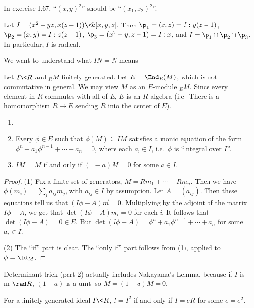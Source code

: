  In exercise I.67, ``$(x,y)^2$'' should be ``$(x_1,x_2)^2$''.

 \begin{example}
   Let $I=(x^2-yz, x(z-1))\< k[x,y,z]$. Then $\p_1=(x,z)=I:y(z-1)$, $\p_2=(x,y)=I:z(z-1)$,
   $\p_3=(x^2-y,z-1)=I:x$, and $I=\p_1\cap\p_2\cap\p_3$. In particular, $I$ is radical.
 \end{example}

 We want to understand what $IN=N$ means.

 Let $I\< R$ and ${}_R M$ finitely generated. Let
 $E=\End_R (M)$, which is not commutative in general. We may view $M$ as an $E$-module
 ${}_E M$. Since every element in $R$ commutes with all of $E$, $E$ is an $R$-algebra (i.e.\
 There is a homomorphism $R\to E$ sending $R$ into the center of $E$).
 \begin{lemma}
  \begin{enumerate}\item[]
    \item Every $\phi\in E$ such that $\phi(M)\subseteq IM$ satisfies a monic equation
    of the form $\phi^n+a_1\phi^{n-1} +\cdots + a_n=0$, where each $a_i\in I$, i.e.\
    $\phi$ is ``integral over $I$''.

    \item $IM=M$ if and only if $(1-a)M=0$ for some $a\in I$.
  \end{enumerate}
 \end{lemma}
 \begin{proof}
   (1) Fix a finite set of generators, $M=Rm_1+\cdots + Rm_n$. Then we have
   $\phi(m_i)=\sum_j a_{ij} m_j$, with $a_{ij}\in I$ by assumption. Let $A=(a_{ij})$.
   Then these equations tell us that $(I\phi-A)\vec{m}=0$. Multiplying by the adjoint of
   the matrix $I\phi-A$, we get that $\det(I\phi-A)m_i=0$ for each $i$. It follows that
   $\det(I\phi-A)=0\in E$. But $\det(I\phi-A)=\phi^n+a_1\phi^{n-1}+\cdots +a_n$ for some
   $a_i\in I$.

   (2) The ``if'' part is clear. The ``only if'' part follows from (1), applied to
   $\phi=\id_M$.
 \end{proof}
 \begin{remark}
   Determinant trick (part 2) actually includes Nakayama's Lemma, because if $I$ is in
   $\rad R$, $(1-a)$ is a unit, so $M=(1-a)M=0$.
 \end{remark}
 \begin{corollary}
   For a finitely generated ideal $I\< R$, $I=I^2$ if and only if $I=eR$ for some
   $e=e^2$.
 \end{corollary}
